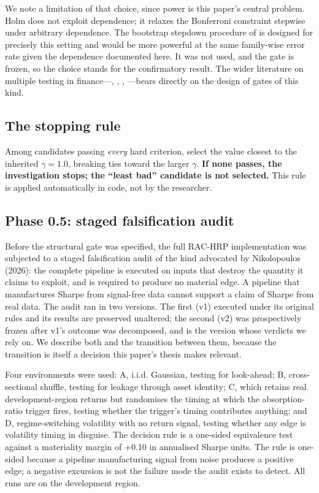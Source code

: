 \documentclass[12pt,letterpaper]{article}
\begin{document}
We note a limitation of that choice, since power is this paper's central problem. Holm
does not exploit dependence; it relaxes the Bonferroni constraint stepwise under
arbitrary dependence. The bootstrap stepdown procedure of \citet{romanowolf2005} is
designed for precisely this setting and would be more powerful at the same family-wise
error rate given the dependence documented here. It was not used, and the gate is
frozen, so the choice stands for the confirmatory result. The wider literature on
multiple testing in finance---\citet{white2000}, \citet{hansen2005},
\citet{harveyliu2015}, \citet{harveyliuzhu2016}---bears directly on the design of
gates of this kind.

\subsection{The stopping rule}

Among candidates passing \emph{every} hard criterion, select the value closest to the
inherited $\gamma = 1.0$, breaking ties toward the larger $\gamma$. \textbf{If none
passes, the investigation stops; the ``least bad'' candidate is not selected.} This
rule is applied automatically in code, not by the researcher.

\subsection{Phase 0.5: staged falsification audit}
\label{sec:phase05}

Before the structural gate was specified, the full RAC-HRP implementation was subjected
to a staged falsification audit of the kind advocated by Nikolopoulos (2026): the
complete pipeline is executed on inputs that destroy the quantity it claims to exploit,
and is required to produce no material edge. A pipeline that manufactures Sharpe from
signal-free data cannot support a claim of Sharpe from real data. The audit ran in two
versions. The first (v1) executed under its original rules and its results are preserved
unaltered; the second (v2) was prospectively frozen after v1's outcome was decomposed,
and is the version whose verdicts we rely on. We describe both and the transition between
them, because the transition is itself a decision this paper's thesis makes relevant.

Four environments were used: A, i.i.d. Gaussian, testing for look-ahead; B,
cross-sectional shuffle, testing for leakage through asset identity; C, which retains
real development-region returns but randomises the timing at which the absorption-ratio
trigger fires, testing whether the trigger's timing contributes anything; and D,
regime-switching volatility with no return signal, testing whether any edge is volatility
timing in disguise. The decision rule is a one-sided equivalence test against a
materiality margin of +0.10 in annualised Sharpe units. The rule is one-sided because a
pipeline manufacturing signal from noise produces a positive edge; a negative excursion
is not the failure mode the audit exists to detect. All runs are on the development
region.
\end{document}
